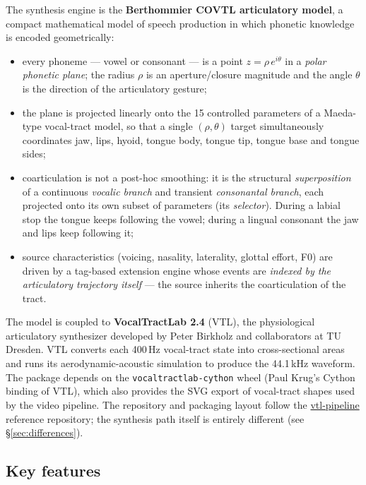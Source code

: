 \documentclass[11pt,a4paper]{article}
\begin{document}
The synthesis engine is the \textbf{Berthommier COVTL articulatory model},
a compact mathematical model of speech production in which phonetic
knowledge is encoded geometrically:

\begin{itemize}[leftmargin=1.5em]
\item every phoneme --- vowel or consonant --- is a point
      \(z = \rho\,e^{i\theta}\) in a \emph{polar phonetic plane}; the
      radius \(\rho\) is an aperture/closure magnitude and the angle
      \(\theta\) is the direction of the articulatory gesture;
\item the plane is projected linearly onto the 15 controlled parameters of
      a Maeda-type vocal-tract model, so that a single \((\rho,\theta)\)
      target simultaneously coordinates jaw, lips, hyoid, tongue body,
      tongue tip, tongue base and tongue sides;
\item coarticulation is not a post-hoc smoothing: it is the structural
      \emph{superposition} of a continuous \emph{vocalic branch} and
      transient \emph{consonantal branch}, each projected onto its own
      subset of parameters (its \emph{selector}). During a labial stop the
      tongue keeps following the vowel; during a lingual consonant the jaw
      and lips keep following it;
\item source characteristics (voicing, nasality, laterality, glottal
      effort, F0) are driven by a tag-based extension engine whose events
      are \emph{indexed by the articulatory trajectory itself} --- the
      source inherits the coarticulation of the tract.
\end{itemize}

The model is coupled to \textbf{VocalTractLab 2.4} (VTL), the
physiological articulatory synthesizer developed by Peter Birkholz and
collaborators at TU Dresden. VTL converts each 400\,Hz vocal-tract state
into cross-sectional areas and runs its aerodynamic-acoustic simulation to
produce the 44.1\,kHz waveform. The package depends on the
\texttt{vocaltractlab-cython} wheel (Paul Krug's Cython binding of VTL),
which also provides the SVG export of vocal-tract shapes used by the video
pipeline. The repository and packaging layout follow the
\href{https://github.com/FBerthommier/vtl-pipeline}{vtl-pipeline}
reference repository; the synthesis path itself is entirely different
(see \S\ref{sec:differences}).

\subsection*{Key features}
\end{document}
